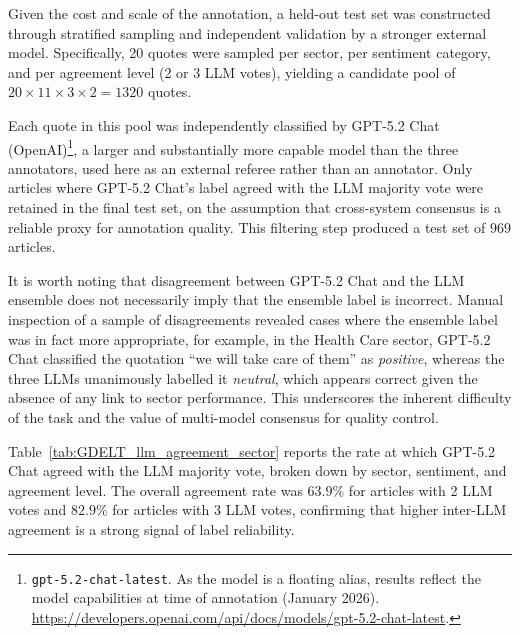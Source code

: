 Given the cost and scale of the annotation, a held-out test set was constructed through stratified sampling and independent validation by a stronger external model. Specifically, 20 quotes were sampled per sector, per sentiment category, and per agreement level (2 or 3 LLM votes), yielding a candidate pool of $20 \times 11 \times 3 \times 2 = \num{1320}$ quotes.

Each quote in this pool was independently classified by GPT-5.2 Chat (OpenAI)\footnote{\texttt{gpt-5.2-chat-latest}. As the model is a floating alias, results reflect the model capabilities at time of annotation (January 2026). \url{https://developers.openai.com/api/docs/models/gpt-5.2-chat-latest}.}, a larger and substantially more capable model than the three annotators, used here as an external referee rather than an annotator. Only articles where GPT-5.2 Chat's label agreed with the LLM majority vote were retained in the final test set, on the assumption that cross-system consensus is a reliable proxy for annotation quality. This filtering step produced a test set of $\num{969}$ articles.

It is worth noting that disagreement between GPT-5.2 Chat and the LLM ensemble does not necessarily imply that the ensemble label is incorrect. Manual inspection of a sample of disagreements revealed cases where the ensemble label was in fact more appropriate, for example, in the Health Care sector, GPT-5.2 Chat classified the quotation ``we will take care of them'' as \textit{positive}, whereas the three LLMs unanimously labelled it \textit{neutral}, which appears correct given the absence of any link to sector performance. This underscores the inherent difficulty of the task and the value of multi-model consensus for quality control.

Table~\ref{tab:GDELT_llm_agreement_sector} reports the rate at which GPT-5.2 Chat agreed with the LLM majority vote, broken down by sector, sentiment, and agreement level. The overall agreement rate was $63.9\%$ for articles with 2 LLM votes and $82.9\%$ for articles with 3 LLM votes, confirming that higher inter-LLM agreement is a strong signal of label reliability.

